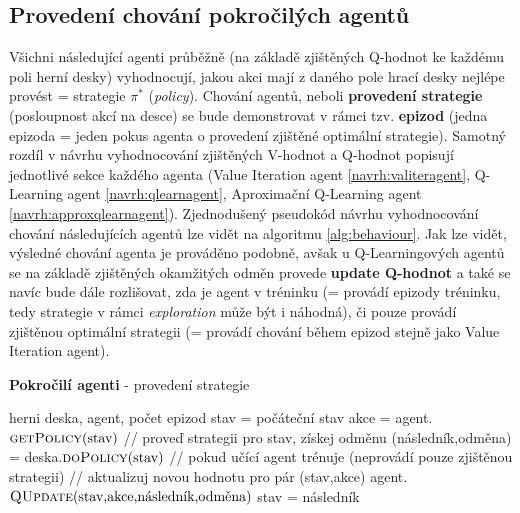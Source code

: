 \subsection{Provedení chování pokročilých agentů}
Všichni následující agenti průběžně (na základě zjištěných Q-hodnot ke každému poli herní desky) vyhodnocují, jakou akci mají z daného pole hrací desky nejlépe provést = strategie $\pi^*$ (\textit{policy}). Chování agentů, neboli \textbf{provedení strategie} (posloupnost akcí na desce) se bude demonstrovat v rámci tzv. \textbf{epizod} (jedna epizoda = jeden pokus agenta o provedení zjištěné optimální strategie). Samotný rozdíl v návrhu vyhodnocování zjištěných V-hodnot a Q-hodnot popisují jednotlivé sekce každého agenta (Value Iteration agent \ref{navrh:valiteragent}, Q-Learning agent \ref{navrh:qlearnagent}, Aproximační Q-Learning agent \ref{navrh:approxqlearnagent}). Zjednodušený pseudokód návrhu vyhodnocování chování následujících agentů lze vidět na algoritmu \ref{alg:behaviour}. Jak lze vidět, výsledné chování agenta je prováděno podobně, avšak u Q-Learningových agentů se na základě zjištěných okamžitých odměn provede \textbf{update Q-hodnot} a také se navíc bude dále rozlišovat, zda je agent v tréninku (= provádí epizody tréninku, tedy strategie v rámci \textit{exploration} může být i náhodná), či pouze provádí zjištěnou optimální strategii (= provádí chování během epizod stejně jako Value Iteration agent).

\begin{algorithm}
\caption{\textbf{Pokročilí agenti} - provedení strategie}
\label{alg:behaviour}
\begin{algorithmic}[1]

\Require herni deska, agent, počet epizod
    stav = počáteční stav
      \State akce = agent.$\text{\Call{getPolicy}{stav}}$ 
      \State // proveď strategii pro stav, získej odměnu
      \State (následník,odměna) = deska.$\text{\Call{doPolicy}{stav}}$
      \State // pokud učící agent trénuje (neprovádí pouze zjištěnou strategii)
          \State // aktualizuj novou hodnotu pro pár (stav,akce)
          \State agent.$\text{\Call{QUpdate}{stav,akce,následník,odměna}}$
        \EndIf
      \EndIf
      \State stav = následník
    \EndWhile
  \EndFor
\EndProcedure

\end{algorithmic}
\end{algorithm}

